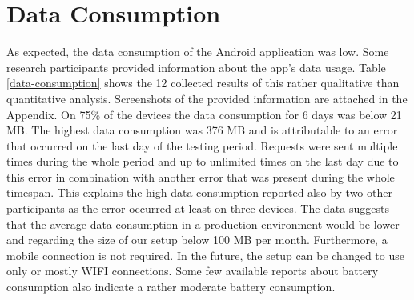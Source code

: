 \section{Data Consumption}
As expected, the data consumption of the Android application was low. Some research participants provided information about the app's data usage. Table \ref{data-consumption} shows the 12 collected results of this rather qualitative than quantitative analysis. Screenshots of the provided information are attached in the Appendix. On 75\% of the devices the data consumption for 6 days was below 21 MB. The highest data consumption was 376 MB and is attributable to an error that occurred on the last day of the testing period. Requests were sent multiple times during the whole period and up to unlimited times on the last day due to this error in combination with another error that was present during the whole timespan. This explains the high data consumption reported also by two other participants as the error occurred at least on three devices. The data suggests that the average data consumption in a production environment would be lower and regarding the size of our setup below 100 MB per month. Furthermore, a mobile connection is not required. In the future, the setup can be changed to use only or mostly WIFI connections.
Some few available reports about battery consumption also indicate a rather moderate battery consumption.

